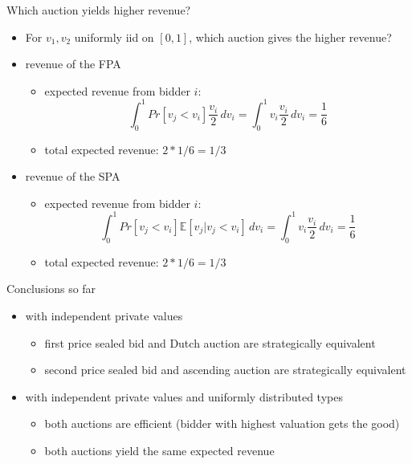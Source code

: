 \documentclass[bigger]{beamer}
\begin{document}
\begin{frame}[label={sec:org5060006}]{Which auction yields higher revenue?}
\begin{itemize}
\item For \(v_1 , v_2\) uniformly iid on \([0,1]\), which auction gives the higher revenue?
\item revenue of the FPA
\begin{itemize}
\item expected revenue from bidder \(i\):
$$\int_0^1 Pr[v_j<v_i]\frac{v_i}{2}\,dv_i=\int_0^1 v_i\frac{v_i}{2}\,dv_i=\frac{1}{6} $$
\item total expected revenue: \(2*1/6=1/3\)
\end{itemize}
\item revenue of the SPA
\begin{itemize}
\item expected revenue from bidder \(i\):
$$\int_0^1 Pr[v_j<v_i]\mathbb{E}[v_j|v_j<v_i]\,dv_i=\int_0^1 v_i \frac{v_i}{2}\,dv_i=\frac{1}{6} $$
\item total expected revenue: \(2*1/6=1/3\)
\end{itemize}
\end{itemize}
\end{frame}

\begin{frame}[label={sec:org50fabf2}]{Conclusions so far}
\begin{itemize}
\item with independent private values
\begin{itemize}
\item first price sealed bid and Dutch auction are strategically equivalent
\item second price sealed bid and ascending auction are strategically equivalent
\end{itemize}
\item with independent private values and uniformly distributed types
\begin{itemize}
\item both auctions are efficient (bidder with highest valuation gets the good)
\item both auctions yield the same expected revenue
\end{itemize}
\end{itemize}
\end{frame}
\end{document}
